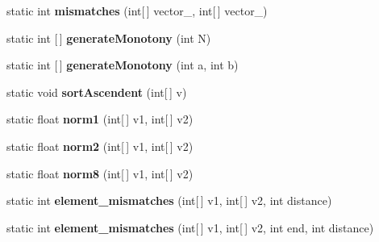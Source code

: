 \begin{DoxyCompactItemize}
static int {\bfseries mismatches} (int\mbox{[}$\,$\mbox{]} vector\+\_, int\mbox{[}$\,$\mbox{]} vector\+\_)
\item 
\mbox{\label{classPOSL_1_1Tools_1_1PoslTools_a420259c499542206581b7af0b96a710f}} 
static int \mbox{[}$\,$\mbox{]} {\bfseries generate\+Monotony} (int N)
\item 
\mbox{\label{classPOSL_1_1Tools_1_1PoslTools_a40861b4fd38cb75c70f50b51ebf12375}} 
static int \mbox{[}$\,$\mbox{]} {\bfseries generate\+Monotony} (int a, int b)
\item 
\mbox{\label{classPOSL_1_1Tools_1_1PoslTools_ad32eba7548b22b8a8eaea3defac73543}} 
static void {\bfseries sort\+Ascendent} (int\mbox{[}$\,$\mbox{]} v)
\item 
\mbox{\label{classPOSL_1_1Tools_1_1PoslTools_a9ff90d344d0220a8682b9db8cde8bd0b}} 
static float {\bfseries norm1} (int\mbox{[}$\,$\mbox{]} v1, int\mbox{[}$\,$\mbox{]} v2)
\item 
\mbox{\label{classPOSL_1_1Tools_1_1PoslTools_af7cd02caff33593324905de5fcd519e0}} 
static float {\bfseries norm2} (int\mbox{[}$\,$\mbox{]} v1, int\mbox{[}$\,$\mbox{]} v2)
\item 
\mbox{\label{classPOSL_1_1Tools_1_1PoslTools_a3b54a0982f42f590907c9f5c85ac9d0d}} 
static float {\bfseries norm8} (int\mbox{[}$\,$\mbox{]} v1, int\mbox{[}$\,$\mbox{]} v2)
\item 
\mbox{\label{classPOSL_1_1Tools_1_1PoslTools_a02716070f8aae581c6e1188898493ccc}} 
static int {\bfseries element\+\_\+mismatches} (int\mbox{[}$\,$\mbox{]} v1, int\mbox{[}$\,$\mbox{]} v2, int distance)
\item 
\mbox{\label{classPOSL_1_1Tools_1_1PoslTools_ac0020ab505979a65bc33a064ac3270e9}} 
static int {\bfseries element\+\_\+mismatches} (int\mbox{[}$\,$\mbox{]} v1, int\mbox{[}$\,$\mbox{]} v2, int end, int distance)
\item 
\mbox{\label{classPOSL_1_1Tools_1_1PoslTools_a62b143484d4dc4a85ecad3bdad9c1e00}} 

\end{DoxyCompactItemize}
